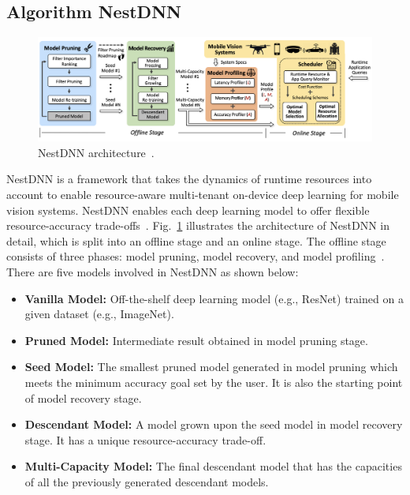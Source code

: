 \documentclass{article}
\begin{document}
\subsection{Algorithm NestDNN}\label{nestdnn}
\begin{figure}[htbp]
	\centering
	\includegraphics[width=1\linewidth]{figure/nestdnn_arch.png}
	\caption{NestDNN architecture~\cite{fang2018nestdnn}.}
	\label{nestdnn_arch}
\end{figure}

NestDNN is a framework that takes the dynamics of runtime resources into account to enable resource-aware multi-tenant on-device deep learning for mobile vision systems. NestDNN enables each deep learning model to offer flexible resource-accuracy trade-offs~\cite{fang2018nestdnn}. Fig.~\ref{nestdnn_arch} illustrates the architecture of NestDNN in detail, which is split into an offline stage and an online stage. The offline stage consists of three phases: model pruning, model recovery, and model profiling~\cite{fang2018nestdnn}. There are five models involved in NestDNN as shown below:

\begin{itemize}
	\item \textbf{Vanilla Model:} Off-the-shelf deep learning model (e.g., ResNet) trained on a given dataset (e.g., ImageNet).
	
	\item \textbf{Pruned Model:} Intermediate result obtained in model pruning stage.
	
	\item \textbf{Seed Model:} The smallest pruned model generated in model pruning which meets the minimum accuracy goal set by the user. It is also the starting point of model recovery stage.
	
	\item \textbf{Descendant Model:} A model grown upon the seed model in model recovery stage. It has a unique resource-accuracy trade-off.
	
	\item \textbf{Multi-Capacity Model:} The final descendant model that has the capacities of all the previously generated descendant models.
	
\end{itemize}
\end{document}
